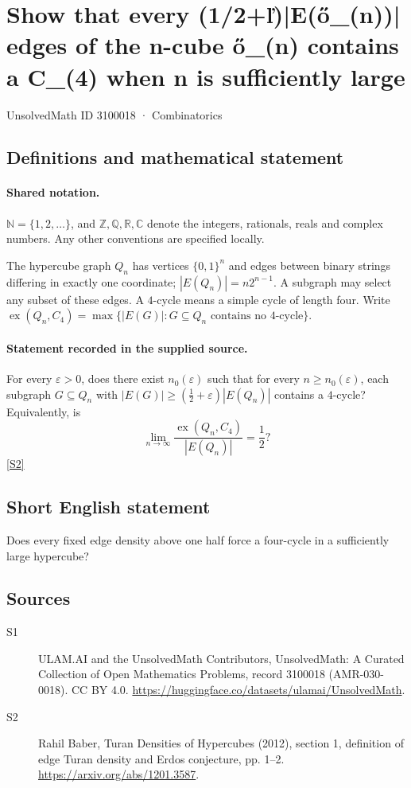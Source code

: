 \documentclass[11pt]{article}
\newcommand{\sref}[2]{\hyperlink{source:#1:#2}{[S#2]}}
\begin{document}
\setcounter{section}{3100017}
\section{Show that every (1/2+ľ)|E(ő\_(n))| edges of the n-cube ő\_(n) contains a C\_(4) when n is sufficiently large}\label{3100018}
{\small\sffamily UnsolvedMath ID 3100018 · Combinatorics}
\subsection{Definitions and mathematical statement}

\paragraph{Shared notation.}$\mathbb N=\{1,2,\ldots\}$, and $\mathbb Z,\mathbb Q,\mathbb R,\mathbb C$ denote the integers, rationals, reals and complex numbers. Any other conventions are specified locally.


The hypercube graph $Q_n$ has vertices $\{0,1\}^n$ and edges between binary strings differing in exactly one coordinate; $|E(Q_n)|=n2^{n-1}$. A subgraph may select any subset of these edges. A $4$-cycle means a simple cycle of length four. Write $\operatorname{ex}(Q_n,C_4)=\max\{|E(G)|:G\subseteq Q_n\text{ contains no }4\text{-cycle}\}$.
\paragraph{Statement recorded in the supplied source.}
For every $\varepsilon>0$, does there exist $n_0(\varepsilon)$ such that for every $n\geq n_0(\varepsilon)$, each subgraph $G\subseteq Q_n$ with $|E(G)|\geq(\tfrac12+\varepsilon)|E(Q_n)|$ contains a $4$-cycle? Equivalently, is
\[\lim_{n\to\infty}\frac{\operatorname{ex}(Q_n,C_4)}{|E(Q_n)|}=\frac12?\] \sref{3100018}{2}
\subsection{Short English statement}
Does every fixed edge density above one half force a four-cycle in a sufficiently large hypercube?
\subsection{Sources}
\begin{description}
\item[\hypertarget{source:3100018:1}{S1}] ULAM.AI and the UnsolvedMath Contributors, UnsolvedMath: A Curated Collection of Open Mathematics Problems, record 3100018 (AMR-030-0018). CC BY 4.0. \url{https://huggingface.co/datasets/ulamai/UnsolvedMath}.
\item[\hypertarget{source:3100018:2}{S2}] Rahil Baber, Turan Densities of Hypercubes (2012), section 1, definition of edge Turan density and Erdos conjecture, pp. 1--2. \url{https://arxiv.org/abs/1201.3587}.
\end{description}
\label{end:3100018}
\end{document}
